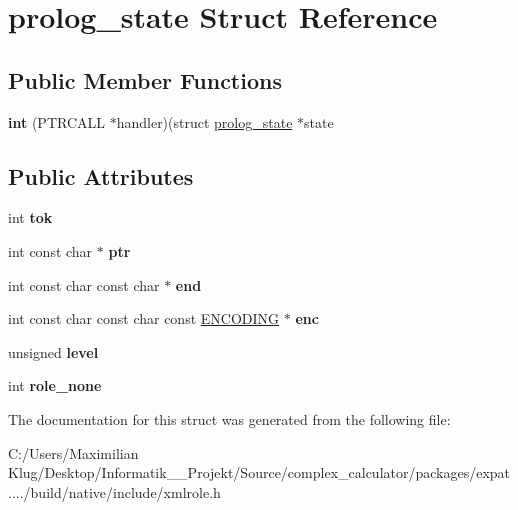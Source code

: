 \hypertarget{structprolog__state}{}\section{prolog\+\_\+state Struct Reference}
\label{structprolog__state}
\subsection*{Public Member Functions}
\begin{DoxyCompactItemize}
\item 
\mbox{\label{structprolog__state_aa5eb5916251da455f404f6acff21225a}} 
{\bfseries int} (P\+T\+R\+C\+A\+LL $\ast$handler)(struct \mbox{\hyperlink{structprolog__state}{prolog\+\_\+state}} $\ast$state
\end{DoxyCompactItemize}
\subsection*{Public Attributes}
\begin{DoxyCompactItemize}
\item 
\mbox{\label{structprolog__state_ac4af903bc6d08bf5945abf850aee2a67}} 
int {\bfseries tok}
\item 
\mbox{\label{structprolog__state_acc32115fc74ba5f3fd3e721670466a15}} 
int const char $\ast$ {\bfseries ptr}
\item 
\mbox{\label{structprolog__state_a038b72ee34bd681594ee9ecc3e2263b8}} 
int const char const char $\ast$ {\bfseries end}
\item 
\mbox{\label{structprolog__state_a7e8562ff36e1a1051fa703ca6f80228e}} 
int const char const char const \mbox{\hyperlink{structencoding}{E\+N\+C\+O\+D\+I\+NG}} $\ast$ {\bfseries enc}
\item 
\mbox{\label{structprolog__state_a9bc6e108c8efd3bc37d42feb18eb8c6b}} 
unsigned {\bfseries level}
\item 
\mbox{\label{structprolog__state_aeba13f636dda0ee3f274a81fd865e223}} 
int {\bfseries role\+\_\+none}
\end{DoxyCompactItemize}


The documentation for this struct was generated from the following file\+:\begin{DoxyCompactItemize}
\item 
C\+:/\+Users/\+Maximilian Klug/\+Desktop/\+Informatik\+\_\+\_\+\+Projekt/\+Source/complex\+\_\+calculator/packages/expat..../build/native/include/xmlrole.\+h\end{DoxyCompactItemize}
